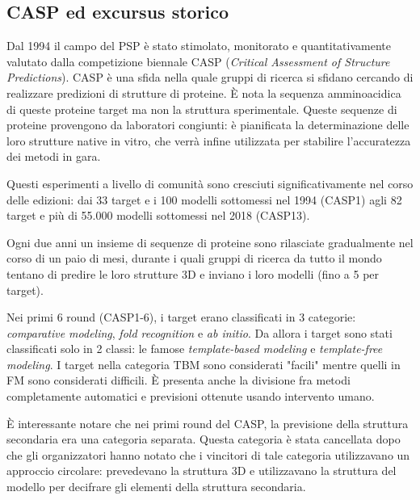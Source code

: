 \subsection{CASP ed excursus storico}  \label{sec:CASP}

Dal 1994 il campo del PSP è stato stimolato, monitorato e quantitativamente valutato dalla competizione biennale CASP (\textit{Critical Assessment of Structure Predictions}). CASP è una sfida nella quale gruppi di ricerca si sfidano cercando di realizzare predizioni di strutture di proteine. È nota la sequenza amminoacidica di queste proteine target ma non la struttura sperimentale. Queste sequenze di proteine provengono da laboratori  congiunti: è pianificata la determinazione delle loro strutture native in vitro, che verrà infine utilizzata per stabilire l'accuratezza dei metodi in gara.

\par Questi esperimenti a livello di comunità sono cresciuti significativamente nel corso delle edizioni: dai 33 target e i 100 modelli sottomessi nel 1994 (CASP1) agli 82 target e più di 55.000 modelli sottomessi nel 2018 (CASP13)\supercite{abbass2020enhancing}.

\par Ogni due anni un insieme di sequenze di proteine sono rilasciate gradualmente nel corso di un paio di mesi, durante i quali gruppi di ricerca da tutto il mondo tentano di predire le loro strutture 3D e inviano i loro modelli (fino a 5 per target).

\par Nei primi 6 round (CASP1-6), i target erano classificati in 3 categorie: \textit{comparative modeling}, \textit{fold recognition} e \textit{ab initio}. Da allora i target sono stati classificati solo in 2 classi: le famose \textit{template-based modeling} e \textit{template-free modeling}. I target nella categoria TBM sono considerati "facili" mentre quelli in FM sono considerati difficili. È presenta anche la divisione fra metodi completamente automatici e previsioni ottenute usando intervento umano.

\par È interessante notare che nei primi round del CASP, la previsione della struttura secondaria era una categoria separata. Questa categoria è stata cancellata dopo che gli organizzatori hanno notato che i vincitori di tale categoria utilizzavano un approccio circolare: prevedevano la struttura 3D e utilizzavano la struttura del modello per decifrare gli elementi della struttura secondaria.

